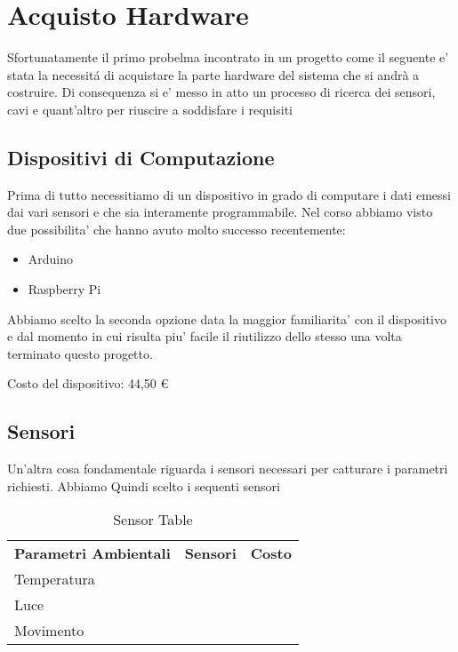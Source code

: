 \section{Acquisto Hardware}

Sfortunatamente il primo probelma incontrato in un progetto come il seguente e' stata la necessit\'a di acquistare la parte hardware del sistema che si andrà a costruire. Di consequenza si e' messo in atto un processo di ricerca dei sensori, cavi e quant'altro per riuscire a soddisfare i requisiti

\subsection{Dispositivi di Computazione}

Prima di tutto necessitiamo di un dispositivo in grado di computare i dati emessi dai vari sensori e che sia interamente programmabile. Nel corso abbiamo visto due possibilita' che hanno avuto molto successo recentemente:

\begin{itemize}
  \item Arduino
  \item Raspberry Pi
\end{itemize}

Abbiamo scelto la seconda opzione data la maggior familiarita' con il dispositivo e dal momento in cui risulta piu' facile il riutilizzo dello stesso una volta terminato questo progetto.

Costo del dispositivo: 44,50 \euro

\subsection{Sensori}

Un'altra cosa fondamentale riguarda i sensori necessari per catturare i parametri richiesti. Abbiamo Quindi scelto i sequenti sensori

\begin{table}[]
\centering
\begin{tabular}{lll}
\cline{1-1}
\multicolumn{1}{|c|}{\textbf{Parametri Ambientali}} & \multicolumn{1}{c}{\textbf{Sensori}} & \multicolumn{1}{c}{\textbf{Costo}} \\ \cline{1-1}
Temperatura                               &                                     &                                   \\
Luce                                      &                                     &                                   \\
Movimento                                 &                                     &                                
\end{tabular}
\caption{Sensor Table}
\label{Sensor Table}
\end{table}

